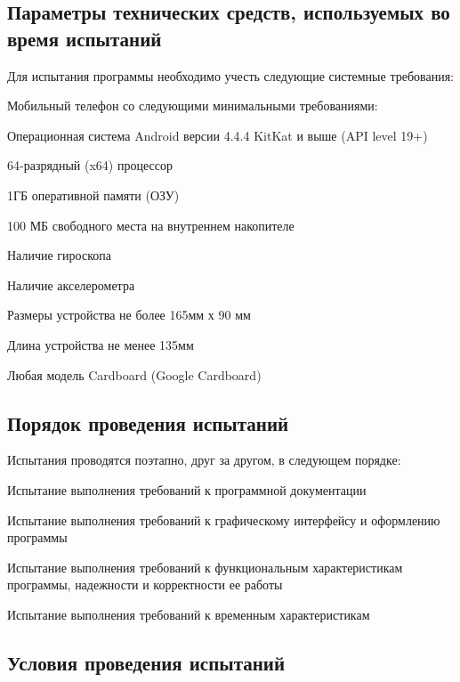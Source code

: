 \subsection{Параметры технических средств, используемых во время испытаний}
Для испытания программы необходимо учесть следующие системные требования:
\begin{my_enumerate}
    \item Мобильный телефон со следующими минимальными требованиями:
    \begin{my_enumerate}
        \item Операционная система Android версии 4.4.4 KitKat и выше (API level 19+)
        \item 64-разрядный (x64) процессор
        \item 1ГБ оперативной памяти (ОЗУ)
        \item 100 МБ свободного места на внутреннем накопителе
        \item Наличие гироскопа
        \item Наличие акселерометра
        \item Размеры устройства не более 165мм х 90 мм
        \item Длина устройства не менее 135мм
    \end{my_enumerate}
    \item Любая модель Cardboard (Google Cardboard)
\end{my_enumerate}


\subsection{Порядок проведения испытаний}
Испытания проводятся поэтапно, друг за другом, в следующем порядке:
\begin{my_enumerate}
    \item Испытание выполнения требований к программной документации
    \item Испытание выполнения требований к графическому интерфейсу и оформлению программы
    \item Испытание выполнения требований к функциональным характеристикам программы, надежности и корректности ее работы
    \item Испытание выполнения требований к временным характеристикам
\end{my_enumerate}


\subsection{Условия проведения испытаний}

